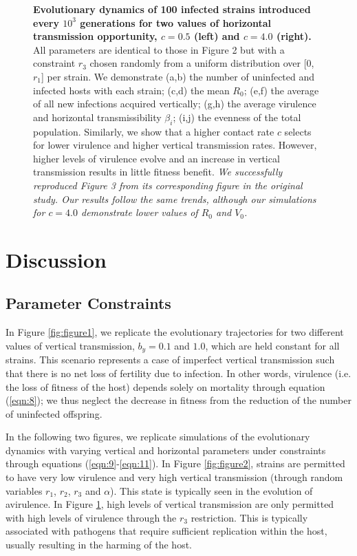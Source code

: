 \begin{figure}[tbph]
\captionsetup{width=1.2\linewidth}
\caption{\textbf{Evolutionary dynamics of 100 infected strains introduced every
$10^3$ generations for two values of horizontal transmission opportunity,
$c = 0.5$ (left) and $c = 4.0$ (right).} All parameters are identical to those
in Figure 2 but with a constraint $r_3$ chosen randomly from a uniform
distribution over [0, $r_1$] per strain. We demonstrate (a,b) the number of
uninfected and infected hosts with each strain; (c,d) the mean $R_0$; (e,f) the
average of all new infections acquired vertically; (g,h) the average virulence
and horizontal transmissibility $\beta_i$; (i,j) the evenness of the total
population. Similarly, we show that a higher contact rate $c$ selects for lower
virulence and higher vertical transmission rates. However, higher levels of
virulence evolve and an increase in vertical transmission results in little
fitness benefit. \textit{We successfully reproduced Figure 3 from its
corresponding figure in the original study. Our results follow the same trends,
although our simulations for $c = 4.0$ demonstrate lower values of $R_0$ and
$V_0$.}
}
\label{fig:figure3}
\end{figure}

\section{Discussion}
\subsection{Parameter Constraints}

In Figure \ref{fig:figure1}, we replicate the evolutionary trajectories for
two different values of vertical transmission, $b_y = 0.1$ and $1.0$, which
are held constant for all strains. This scenario represents a case of imperfect
vertical transmission such that there is no net loss of fertility due to
infection. In other words, virulence (i.e. the loss of fitness of the host)
depends solely on mortality through equation (\ref{eqn:8}); we thus neglect
the decrease in fitness from the reduction of the number of uninfected offspring.

In the following two figures, we replicate simulations of the evolutionary
dynamics with varying vertical and horizontal parameters under constraints
through equations (\ref{eqn:9}-\ref{eqn:11}). In Figure \ref{fig:figure2},
strains are permitted to have very low virulence and very high vertical
transmission (through random variables $r_1$, $r_2$, $r_3$ and $\alpha$). This
state is typically seen in the evolution of avirulence. In Figure
\ref{fig:figure3}, high levels of vertical transmission are only permitted with
high levels of virulence through the $r_3$ \in [0, $r_1$] restriction. This is
typically associated with pathogens that require sufficient replication within
the host, usually resulting in the harming of the host.

